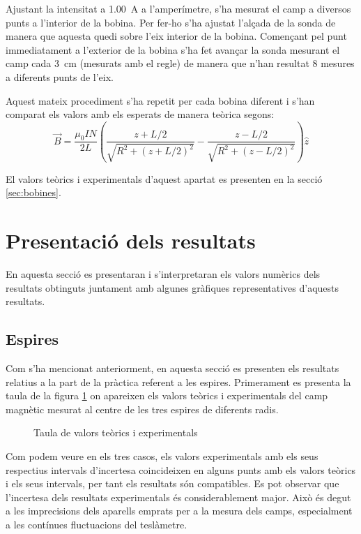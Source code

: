 Ajustant la intensitat a \SI{1.00}{A} a l'amperímetre, s'ha mesurat el camp a diversos punts a l'interior de la bobina. Per fer-ho s'ha ajustat l'alçada de la sonda de manera que aquesta quedi sobre l'eix interior de la bobina. Començant pel punt immediatament a l'exterior de la bobina s'ha fet avançar la sonda mesurant el camp cada \SI{3}{cm} (mesurats amb el regle) de manera que n'han resultat 8 mesures a diferents punts de l'eix.

Aquest mateix procediment s'ha repetit per cada bobina diferent i s'han comparat els valors amb els esperats de manera teòrica segons:
\begin{equation}
  \vec{B}=\frac{\mu_0 I N}{2 L}\left(\frac{z + L/2}{\sqrt{R^2+(z+L/2)^2}} - \frac{z - L/2}{\sqrt{R^2 + (z - L/2)^2}}\right)\hat{z}
\end{equation}

El valors teòrics i experimentals d'aquest apartat es presenten en la secció \cref{sec:bobines}.

\section{Presentació dels resultats}
En aquesta secció es presentaran i s'interpretaran els valors numèrics dels resultats obtinguts juntament amb algunes gràfiques representatives d'aquests resultats.

\subsection{Espires}\label{sec:espires}
Com s'ha mencionat anteriorment, en aquesta secció es presenten els resultats relatius a la part de la pràctica referent a les espires. Primerament es presenta la taula de la figura \cref{tab:espires} on apareixen els valors teòrics i experimentals del camp magnètic mesurat al centre de les tres espires de diferents radis.

\begin{figure}[htb]
  \centering
  \caption{Taula de valors teòrics i experimentals}
  \label{tab:espires}
\end{figure}

Com podem veure en els tres casos, els valors experimentals amb els seus respectius intervals d'incertesa coincideixen en alguns punts amb els valors teòrics i els seus intervals, per tant els resultats són compatibles. Es pot observar que l'incertesa dels resultats experimentals és considerablement major. Això és degut a les imprecisions dels aparells emprats per a la mesura dels camps, especialment a les contínues fluctuacions del teslàmetre. 

